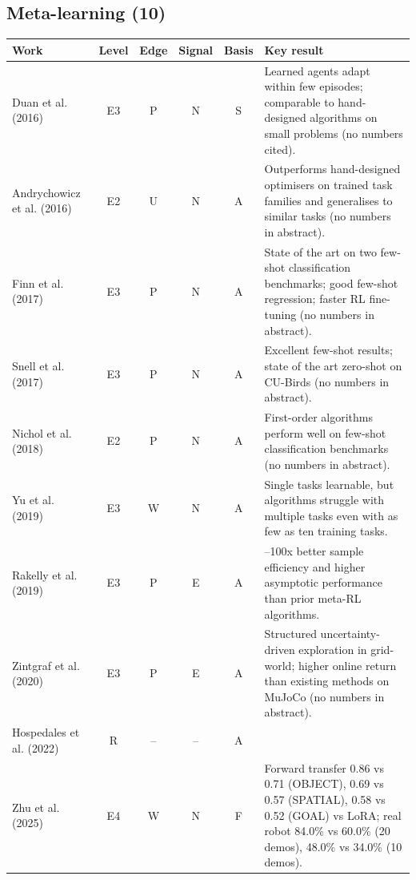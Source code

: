 \documentclass[10pt,a4paper]{article}
\begin{document}
\subsection*{Meta-learning (10)}
\begin{longtable}{@{}>{\raggedright\arraybackslash}p{4.0cm}cccc>{\raggedright\arraybackslash}p{7.6cm}@{}}
\toprule \textbf{Work} & \textbf{Level} & \textbf{Edge} & \textbf{Signal} & \textbf{Basis} & \textbf{Key result} \\ \midrule \endhead
Duan et al. (2016)~\cite{Duan2016} & E3 & P & N & S & Learned agents adapt within few episodes; comparable to hand-designed algorithms on small problems (no numbers cited). \\
Andrychowicz et al. (2016)~\cite{Andrychowicz2016} & E2 & U & N & A & Outperforms hand-designed optimisers on trained task families and generalises to similar tasks (no numbers in abstract). \\
Finn et al. (2017)~\cite{Finn2017} & E3 & P & N & A & State of the art on two few-shot classification benchmarks; good few-shot regression; faster RL fine-tuning (no numbers in abstract). \\
Snell et al. (2017)~\cite{Snell2017} & E3 & P & N & A & Excellent few-shot results; state of the art zero-shot on CU-Birds (no numbers in abstract). \\
Nichol et al. (2018)~\cite{Nichol2018} & E2 & P & N & A & First-order algorithms perform well on few-shot classification benchmarks (no numbers in abstract). \\
Yu et al. (2019)~\cite{Yu2019} & E3 & W & N & A & Single tasks learnable, but algorithms struggle with multiple tasks even with as few as ten training tasks. \\
Rakelly et al. (2019)~\cite{Rakelly2019} & E3 & P & E & A & 20--100x better sample efficiency and higher asymptotic performance than prior meta-RL algorithms. \\
Zintgraf et al. (2020)~\cite{Zintgraf2020} & E3 & P & E & A & Structured uncertainty-driven exploration in grid-world; higher online return than existing methods on MuJoCo (no numbers in abstract). \\
Hospedales et al. (2022)~\cite{Hospedales2022} & R & -- & -- & A &  \\
Zhu et al. (2025)~\cite{Zhu2025} & E4 & W & N & F & Forward transfer 0.86 vs 0.71 (OBJECT), 0.69 vs 0.57 (SPATIAL), 0.58 vs 0.52 (GOAL) vs LoRA; real robot 84.0\% vs 60.0\% (20 demos), 48.0\% vs 34.0\% (10 demos). \\
\bottomrule\end{longtable}
\end{document}

